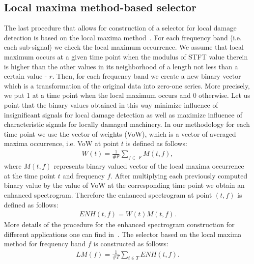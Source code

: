 \subsection{Local maxima method-based selector}
The last procedure that allows for construction of a selector for local damage detection is based on the local maxima method~\cite{Obuchowski2014325,Obuchowski2014389}. For each frequency band (i.e. each sub-signal) we check the local maximum occurrence. We assume that local maximum occurs at a given time point when the modulus of STFT value therein is higher than the other values in its neighborhood of a length not less than a certain value - $r$. Then, for each frequency band we create a new binary vector which is a transformation of the original data into zero-one series. More precisely, we put 1 at a time point when the local maximum occurs and 0 otherwise. Let us point that the binary values obtained in this way minimize influence of insignificant signals for local damage detection as well as maximize influence of characteristic signals for locally damaged machinery. In our methodology for each time point we use the vector of weights (VoW), which is a vector of averaged maxima occurrence, i.e. VoW at point $t$ is defined as follows:
\begin{eqnarray}
W(t)=\frac{1}{\#\textit{F}}\sum_{f\in\textit{ F}}M(t,f),
\end{eqnarray}
where $M(t,f)$  represents binary valued vector of the local maxima occurrence at the time point  $t$ and frequency $f$. After multiplying each previously computed binary value by the value of VoW at the corresponding time point we obtain an enhanced spectrogram. Therefore the enhanced spectrogram at point $(t,f)$ is defined as follows:
\begin{eqnarray}
ENH(t,f)=W(t)M(t,f).
\end{eqnarray}
More details of the procedure for the enhanced spectrogram construction for different applications one can find in~\cite{Obuchowski2014325,Obuchowski2014389}. The selector based on the local maxima method for frequency band $f$ is constructed as follows:
\begin{eqnarray}
LM(f)=\frac{1}{\#T}\sum_{t\in T}ENH(t,f).
\end{eqnarray}
\FloatBarrier